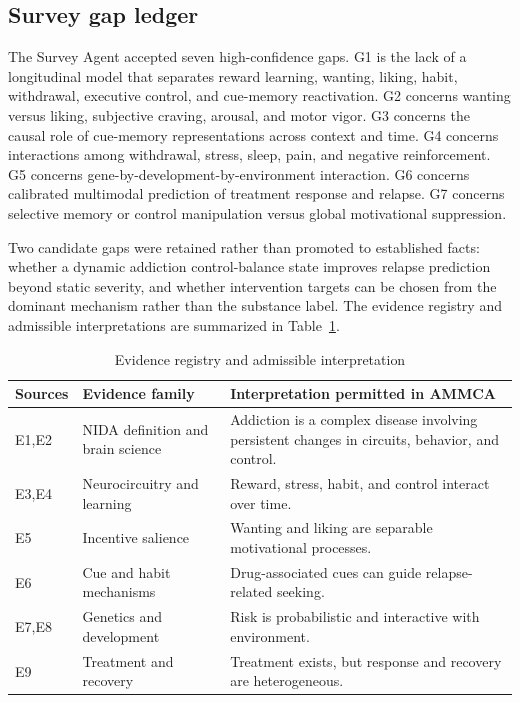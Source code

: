 \documentclass[conference]{IEEEtran}
\begin{document}
\subsection{Survey gap ledger}
The Survey Agent accepted seven high-confidence gaps. G1 is the lack of a longitudinal model that separates reward learning, wanting, liking, habit, withdrawal, executive control, and cue-memory reactivation. G2 concerns wanting versus liking, subjective craving, arousal, and motor vigor. G3 concerns the causal role of cue-memory representations across context and time. G4 concerns interactions among withdrawal, stress, sleep, pain, and negative reinforcement. G5 concerns gene-by-development-by-environment interaction. G6 concerns calibrated multimodal prediction of treatment response and relapse. G7 concerns selective memory or control manipulation versus global motivational suppression.

Two candidate gaps were retained rather than promoted to established facts: whether a dynamic addiction control-balance state improves relapse prediction beyond static severity, and whether intervention targets can be chosen from the dominant mechanism rather than the substance label. The evidence registry and admissible interpretations are summarized in Table~\ref{tab:evidence}.

\begin{table}[t]
\caption{Evidence registry and admissible interpretation}
\label{tab:evidence}
\centering
\footnotesize
\setlength{\tabcolsep}{2pt}
\begin{tabular}{p{}p{}p{}}
\toprule
Sources & Evidence family & Interpretation permitted in AMMCA \\
\midrule
E1,E2 & NIDA definition and brain science & Addiction is a complex disease involving persistent changes in circuits, behavior, and control. \\
E3,E4 & Neurocircuitry and learning & Reward, stress, habit, and control interact over time. \\
E5 & Incentive salience & Wanting and liking are separable motivational processes. \\
E6 & Cue and habit mechanisms & Drug-associated cues can guide relapse-related seeking. \\
E7,E8 & Genetics and development & Risk is probabilistic and interactive with environment. \\
E9 & Treatment and recovery & Treatment exists, but response and recovery are heterogeneous. \\
\bottomrule
\end{tabular}
\end{table}
\end{document}
